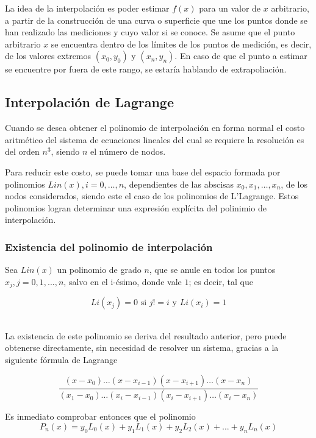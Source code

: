 \documentclass[conference]{IEEEtran}
\begin{document}
La idea de la interpolación es poder estimar $f(x)$ para un valor de $x$ arbitrario, a partir de la construcción de una curva o superﬁcie que une los puntos donde se han realizado las mediciones y cuyo valor si se conoce. Se asume que el punto arbitrario $x$ se encuentra dentro de los límites de los puntos de medición, es decir, de los valores extremos $(x_0, y_0)$ y $(x_n, y_n)$. En caso de que el punto a estimar se encuentre por fuera de este rango, se estaría hablando de extrapoliación. \cite{b2}\par

\subsection{Interpolación de Lagrange}

Cuando se desea obtener el polinomio de interpolación en forma normal el costo aritmético del sistema de ecuaciones lineales del cual se requiere la resolución es del orden $n^3$, siendo $n$ el número de nodos. \par

Para reducir este costo, se puede tomar una base del espacio formada por polinomios $Lin(x),i=0, \ldots, n$, dependientes de las abscisas $x_0, x_1, \ldots, x_n$, de los nodos considerados, siendo este el caso de los polinomios de L'Lagrange. Estos polinomios logran determinar una expresión explícita del polinimio de interpolación. \par

\subsubsection{Existencia del polinomio de interpolación}

Sea $Lin(x)$ un polinomio de grado $n$, que se anule en todos los puntos $x_j, j = 0, 1, ..., n$, salvo en el i-ésimo, donde vale $1$; es decir, tal que

\[ Li(x_j) = 0 \text{ si } j!= i \text{ y } Li(x_i) = 1 \]\

La existencia de este polinomio se deriva del resultado anterior, pero puede obtenerse directamente, sin necesidad de resolver un sistema, gracias a la siguiente fórmula de Lagrange \cite{b1}\par

\[ \frac{(x-x_0)\ldots(x-x_{i-1})(x-x_{i+1})\ldots(x-x_n)}{(x_1-x_0)\ldots(x_i-x_{i-1})(x_i-x_{i+1})\ldots(x_i-x_n)} \]

Es inmediato comprobar entonces que el polinomio 
\[ P_n(x) = y_0 L_0(x) + y_1 L_1(x) + y_2 L_2(x) + ... + y_n L_n(x) \]
\end{document}
